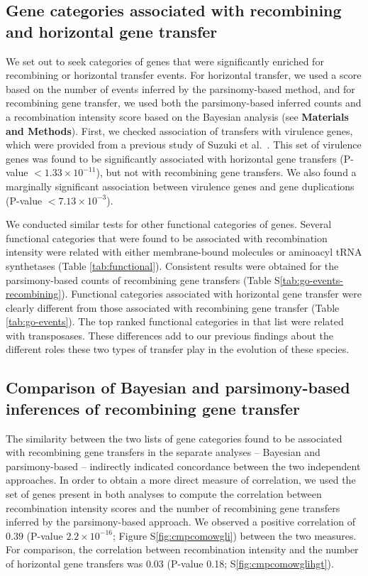 \documentclass[10pt]{article}
\let\citet\cite
\begin{document}
\subsection*{Gene categories associated with recombining and horizontal gene transfer}

We set out to seek categories of genes that were significantly enriched for
recombining or horizontal transfer events. For horizontal
transfer, we used a score based on the number of events inferred by the
parsinomy-based method, and for recombining gene transfer, we used both the
parsimony-based inferred counts and a recombination intensity score based on the
Bayesian analysis (see \textbf{Materials and Methods}). First, we checked association of
transfers with virulence genes, which were provided from a previous study
of Suzuki et al.\ \citet{Suzuki2011}.
This set of virulence genes was found to be significantly associated
with horizontal gene transfers (P-value $<1.33 \times 10^{-11}$), but not with
recombining gene transfers. We also found a marginally
significant association between virulence genes and gene duplications (P-value
$<7.13 \times 10^{-3}$).

We conducted similar tests for other functional categories of genes. Several
functional categories that were found to be associated with recombination
intensity were related with either membrane-bound molecules or aminoacyl tRNA
synthetases (Table \ref{tab:functional}). Consistent results were obtained for
the parsimony-based counts of recombining gene transfers (Table
S\ref{tab:go-events-recombining}).  Functional categories associated with
horizontal gene transfer were clearly different from those associated with
recombining gene transfer (Table \ref{tab:go-events}). The top ranked functional
categories in that list were related with transposases. These differences add to
our previous findings about the different roles these two types of transfer play
in the evolution of these species.

\subsection*{Comparison of Bayesian and parsimony-based inferences of recombining gene transfer}

The similarity between the two lists of gene categories found to be associated
with recombining gene transfers in the separate analyses -- Bayesian and
parsimony-based --  indirectly indicated concordance between the two independent
approaches.  In order to obtain a more direct measure of correlation, we used
the set of genes present in both analyses to compute the correlation between
recombination intensity scores and the number of recombining gene transfers
inferred by the parsimony-based approach. We observed a positive correlation of
$0.39$ (P-value $2.2\times10^{-16}$; Figure S\ref{fig:cmpcomowgli}) between the
two measures.  For comparison, the correlation between recombination intensity
and the number of horizontal gene transfers was 0.03 (P-value 0.18;
S\ref{fig:cmpcomowglihgt}).  
\end{document}
